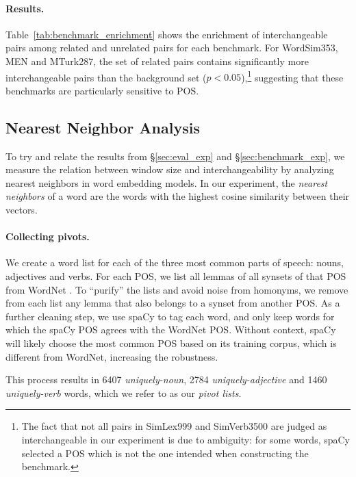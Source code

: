 \documentclass[11pt,a4paper]{article}
\begin{document}
    \paragraph{Results.}
    
    Table~\ref{tab:benchmark_enrichment} shows the enrichment of interchangeable pairs
    among related and unrelated pairs for each benchmark.
    For WordSim353, MEN and MTurk287, the set of related pairs
    contains significantly more interchangeable pairs than the background
    set ($p<0.05$),\footnote{The fact that not all pairs in SimLex999 and SimVerb3500
    are judged as interchangeable
    in our experiment is due to ambiguity: for some words, spaCy selected a POS
    which is not the one intended when constructing the benchmark.}
    suggesting that these benchmarks are particularly sensitive to POS.
    
    
    \subsection{Nearest Neighbor Analysis}\label{sec:interchangeability_exp}
    
    To try and relate the results from \S\ref{sec:eval_exp} and \S\ref{sec:benchmark_exp},
    we measure the relation between window size and interchangeability
    by analyzing nearest neighbors in word embedding models.
    In our experiment, the \textit{nearest neighbors} of a word are the words
    with the highest cosine similarity between their vectors.
        
    \paragraph{Collecting pivots.}
    
    We create a word list for each of the three most
    common parts of speech:
    nouns, adjectives and verbs.
    For each POS, we list all lemmas of all synsets of that POS from
    WordNet \cite{miller1998wordnet}.
    To ``purify'' the lists and avoid noise from homonyms,
    we remove from each list any lemma that also belongs to a synset from
    another POS.
    As a further cleaning step, we use spaCy to tag each word,
    and only keep words for which the spaCy POS agrees with the WordNet POS.
    Without context, spaCy will likely choose the most
    common POS based on its training corpus, which is different from WordNet,
    increasing the robustness.
    
    This process results in 6407 \textit{uniquely-noun}, 2784 \textit{uniquely-adjective}
    and 1460 \textit{uniquely-verb} words, which we refer to as our \textit{pivot lists}.
    
\end{document}
